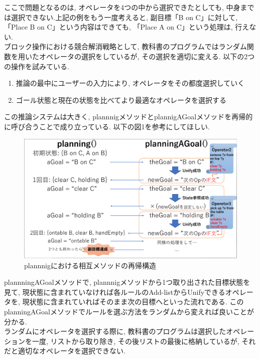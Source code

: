 \documentclass[uplatex,12pt]{jsarticle}
\begin{document}
ここで問題となるのは, オペレータを4つの中から選択できたとしても, 中身までは選択できない.上記の例をもう一度考えると, 副目標「B on C」に対して, 「Place B on C」という内容はできても, 「Place A on C」という処理は, 行えない. \\

ブロック操作における競合解消戦略として, 教科書のプログラムではランダム関数を用いたオペレータの選択をしているが, その選択を適切に変える. 以下の2つの操作を試みている.

\begin{enumerate}
\item 推論の最中にユーザーの入力により, オペレータをその都度選択していく
\item ゴール状態と現在の状態を比べてより最適なオペレータを選択する
\end{enumerate} 

この推論システムは大きく, plannnigメソッドとplannigAGoalメソッドを再帰的に呼び合うことで成り立っている.
以下の図1を参考にしてほしい.
\begin{figure}[htbp]
 \begin{center}
  \includegraphics[width = 12cm, pagebox = cropbox, clip]{images/planning.pdf}
 \end{center}
 \caption[]{plannnigにおける相互メソッドの再帰構造}\label{fig:fig1.1}
\end{figure}

plannningAGoalメソッドで, plannnigメソッドから1つ取り出された目標状態を見て, 現状態に含まれていなければ各ルールのAdd-listからUnifyできるオペレータを,  現状態に含まれていればそのまま次の目標へといった流れである. このplanningAGoalメソッドでルールを選ぶ方法をランダムから変えれば良いことが分かる.\\

ランダムにオペレータを選択する際に, 教科書のプログラムは選択したオペレーションを一度, リストから取り除き, その後リストの最後に格納しているが, それだと適切なオペレータを選択できない.
\end{document}
